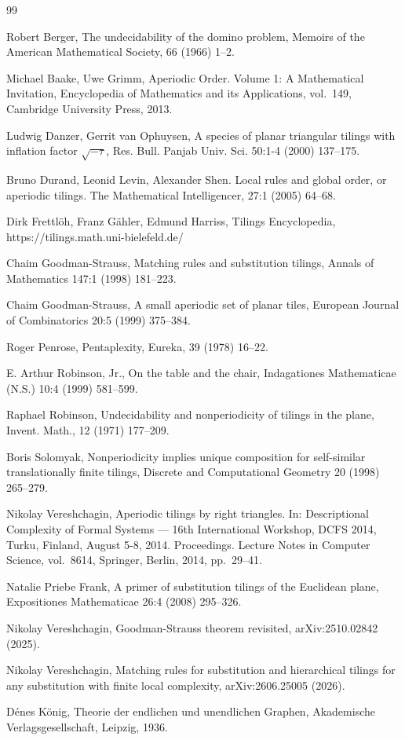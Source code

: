 \documentclass[11pt]{article}
\theoremstyle{remark}
\begin{document}
\begin{thebibliography}{99}

Robert Berger, The undecidability of the domino problem, Memoirs of the American Mathematical Society, 66 (1966) 1--2.

 Michael Baake, Uwe Grimm, Aperiodic Order. Volume 1: A Mathematical Invitation,
 Encyclopedia of Mathematics and its Applications, vol.~149, Cambridge University Press, 2013.

Ludwig Danzer, Gerrit van Ophuysen, A species of planar triangular tilings with inflation factor $\sqrt{-\tau}$, Res. Bull. Panjab Univ. Sci. 50:1-4 (2000) 137--175.

 Bruno Durand, Leonid Levin, Alexander Shen.
  Local rules and global order, or aperiodic tilings.
The Mathematical Intelligencer, 27:1 (2005) 64--68.

 Dirk Frettl\"oh, Franz G\"ahler, Edmund Harriss, Tilings Encyclopedia, https://tilings.math.uni-bielefeld.de/

 Chaim Goodman-Strauss, Matching rules and substitution tilings,
 Annals of Mathematics 147:1 (1998) 181--223.

 Chaim Goodman-Strauss, A small aperiodic set of planar tiles,
 European Journal of Combinatorics 20:5 (1999) 375--384.

 Roger  Penrose, Pentaplexity, Eureka, 39 (1978) 16--22.

 E. Arthur Robinson, Jr., On the table and the chair, Indagationes Mathematicae (N.S.) 10:4 (1999) 581--599.

 Raphael
 Robinson, Undecidability and nonperiodicity of tilings in the plane, Invent. Math., 12 (1971) 177--209.

  Boris Solomyak, Nonperiodicity implies unique composition for self-similar translationally finite tilings, Discrete and Computational Geometry 20 (1998) 265--279.

 Nikolay Vereshchagin, Aperiodic tilings by right triangles. In: Descriptional Complexity of Formal Systems --- 16th International Workshop, DCFS 2014, Turku, Finland, August 5-8, 2014. Proceedings. Lecture Notes in Computer Science, vol.~8614, Springer, Berlin, 2014, pp.~29--41.

 Natalie Priebe Frank, A primer of substitution tilings of the Euclidean plane, Expositiones Mathematicae 26:4 (2008) 295--326.

 Nikolay Vereshchagin, Goodman-Strauss theorem revisited, arXiv:2510.02842 (2025).

 Nikolay Vereshchagin, Matching rules for substitution and hierarchical tilings for any substitution with finite local complexity, arXiv:2606.25005 (2026).

 Dénes König, Theorie der endlichen und unendlichen Graphen, Akademische Verlagsgesellschaft, Leipzig, 1936.

\end{thebibliography}
\end{document}
